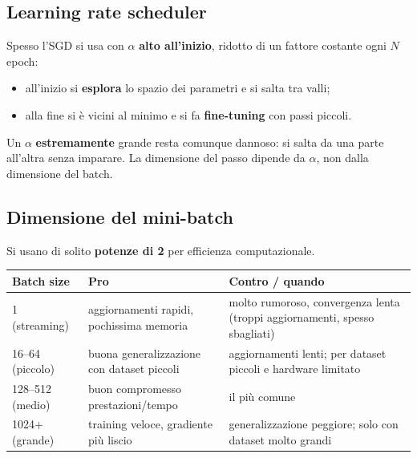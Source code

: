 \subsection{Learning rate scheduler}
Spesso l'SGD si usa con $\alpha$ \textbf{alto all'inizio}, ridotto di un fattore costante ogni $N$ epoch:
\begin{itemize}
  \item all'inizio si \textbf{esplora} lo spazio dei parametri e si salta tra valli;
  \item alla fine si è vicini al minimo e si fa \textbf{fine-tuning} con passi piccoli.
\end{itemize}
Un $\alpha$ \textbf{estremamente} grande resta comunque dannoso: si salta da una parte all'altra senza imparare.
La dimensione del passo dipende da $\alpha$, non dalla dimensione del batch.

\subsection{Dimensione del mini-batch}\label{sec:batch-size}
Si usano di solito \textbf{potenze di 2} per efficienza computazionale.
\begin{center}
\small
\begin{tabularx}{\textwidth}{l X X}
\toprule
\textbf{Batch size} & \textbf{Pro} & \textbf{Contro / quando}\\
\midrule
1 (streaming) & aggiornamenti rapidi, pochissima memoria & molto rumoroso, convergenza lenta (troppi aggiornamenti, spesso sbagliati)\\
16--64 (piccolo) & buona generalizzazione con dataset piccoli & aggiornamenti lenti; per dataset piccoli e hardware limitato\\
128--512 (medio) & buon compromesso prestazioni/tempo & il più comune\\
1024+ (grande) & training veloce, gradiente più liscio & generalizzazione peggiore; solo con dataset molto grandi\\
\bottomrule
\end{tabularx}
\end{center}

